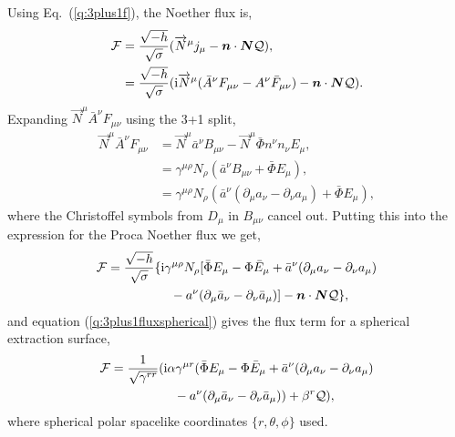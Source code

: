  Using Eq.~(\ref{q:3plus1f}), the Noether flux is,
\begin{align}
\mathcal{F} &= \frac{\sqrt{-h}}{\sqrt{\sigma}}(\overrightarrow{N}^\mu j_\mu - \boldsymbol{n} \cdot \boldsymbol{N}  \mathcal{Q}), \\
 &= \frac{\sqrt{-h}}{\sqrt{\sigma}} ( {\rm i}\overrightarrow{N}^\mu (\bar{A}^\nu F_{\mu\nu} - A^\nu \bar{F}_{\mu\nu}) - \boldsymbol{n} \cdot \boldsymbol{N}  \mathcal{Q}).
 \end{align}
 Expanding $\overrightarrow{N}^\mu \bar{A}^\nu F_{\mu\nu}$ using the 3+1 split,
 \begin{align}
 \overrightarrow{N}^\mu \bar{A}^\nu F_{\mu\nu} &= \overrightarrow{N}^\mu \bar{a}^\nu B_{\mu\nu} - \overrightarrow{N}^\mu\bar{\Phi} n^\nu n_\nu E_\mu, \\
                            &= \gamma^{\mu\rho }{N}_\rho( \bar{a}^\nu B_{\mu\nu} +  \bar{\Phi}E_\mu),\\
                            &= \gamma^{\mu\rho }{N}_\rho( \bar{a}^\nu (\partial_\mu a_\nu - \partial_\nu a_\mu) +  \bar{\Phi}E_\mu),
 \end{align}
 where the Christoffel symbols from $D_\mu$ in $B_{\mu\nu}$ cancel out. Putting this into the expression for the Proca Noether flux we get,
 \begin{align}
  \begin{split}\mathcal{F}&= \frac{\sqrt{-h}}{\sqrt{\sigma}} \{ {\rm i}\gamma^{\mu\rho}{N}_\rho [\bar{\Phi} E_\mu  -\Phi  \bar{E}_{\mu} +\bar{a}^\nu (\partial_\mu a_\nu - \partial_\nu a_\mu) \\ &\quad\quad\quad\quad\quad-  a^\nu (\partial_\mu \bar{a}_\nu - \partial_\nu \bar{a}_\mu)] - \boldsymbol{n} \cdot \boldsymbol{N}  \mathcal{Q}\},\end{split}
 \end{align}
 and equation (\ref{q:3plus1fluxspherical}) gives the flux term for a spherical extraction surface,
 \begin{align} \begin{split}
\mathcal{F}&= \frac{1}{\sqrt{\gamma^{rr}}} ( {\rm i}\alpha\gamma^{\mu r} ( \bar{\Phi} E_\mu - {\Phi} \bar{E}_\mu + \bar{a}^\nu (\partial_\mu a_\nu - \partial_\nu a_\mu)  \\&\quad\quad\quad\quad\quad- {a}^\nu (\partial_\mu \bar{a}_\nu - \partial_\nu \bar{a}_\mu) ) + \beta^r  \mathcal{Q}),
 \end{split}\end{align}
 where spherical polar spacelike coordinates $\{r,\theta,\phi\}$ used.













